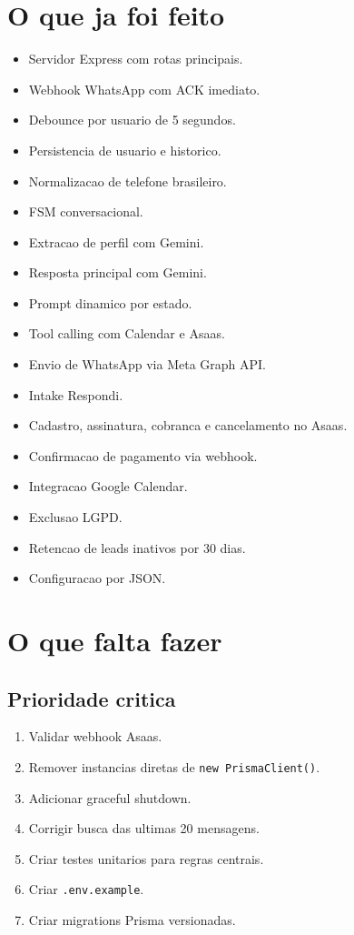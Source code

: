 \documentclass[11pt,a4paper]{article}
\begin{document}
\section{O que ja foi feito}

\begin{itemize}
  \item Servidor Express com rotas principais.
  \item Webhook WhatsApp com ACK imediato.
  \item Debounce por usuario de 5 segundos.
  \item Persistencia de usuario e historico.
  \item Normalizacao de telefone brasileiro.
  \item FSM conversacional.
  \item Extracao de perfil com Gemini.
  \item Resposta principal com Gemini.
  \item Prompt dinamico por estado.
  \item Tool calling com Calendar e Asaas.
  \item Envio de WhatsApp via Meta Graph API.
  \item Intake Respondi.
  \item Cadastro, assinatura, cobranca e cancelamento no Asaas.
  \item Confirmacao de pagamento via webhook.
  \item Integracao Google Calendar.
  \item Exclusao LGPD.
  \item Retencao de leads inativos por 30 dias.
  \item Configuracao por JSON.
\end{itemize}

\section{O que falta fazer}

\subsection{Prioridade critica}

\begin{enumerate}
  \item Validar webhook Asaas.
  \item Remover instancias diretas de \texttt{new PrismaClient()}.
  \item Adicionar graceful shutdown.
  \item Corrigir busca das ultimas 20 mensagens.
  \item Criar testes unitarios para regras centrais.
  \item Criar \texttt{.env.example}.
  \item Criar migrations Prisma versionadas.
\end{enumerate}
\end{document}
